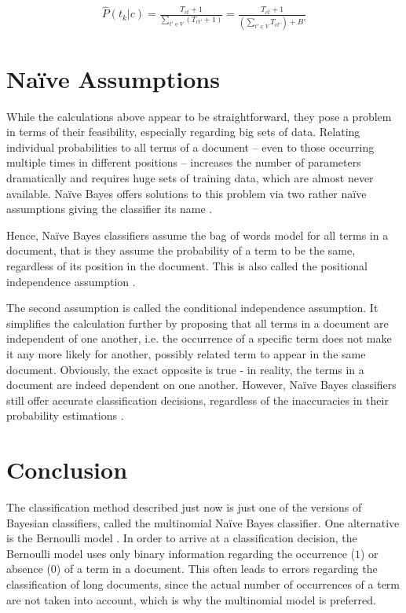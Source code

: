 \begin{gather}
    \hat{P}(t_{k}|c)    = \frac{T_{ct} + 1}{\sum_{t' \in V} (T_{ct'} + 1)}
                        = \frac{T_{ct} + 1}{(\sum_{t' \in V} T_{ct'}) + B'} \label{eq:laplace}
\end{gather}

\section{Na\"ive Assumptions} \label{sec:naive}

While the calculations above appear to be straightforward, they pose a problem in terms of their feasibility, especially regarding big sets of data. Relating individual probabilities to all terms of a document – even to those occurring multiple times in different positions – increases the number of parameters dramatically and requires huge sets of training data, which are almost never available. Naïve Bayes offers solutions to this problem via two rather na\"ive assumptions giving the classifier its name \citep{Manning2009, martin2018speech}. 

Hence, Na\"ive Bayes classifiers assume the bag of words model for all terms in a document, that is they assume the probability of a term to be the same, regardless of its position in the document. This is also called the positional independence assumption \citep{Manning2009, martin2018speech}.

The second assumption is called the conditional independence assumption. It simplifies the calculation further by proposing that all terms in a document are independent of one another, i.e. the occurrence of a specific term does not make it any more likely for another, possibly related term to appear in the same document. Obviously, the exact opposite is true - in reality, the terms in a document are indeed dependent on one another. However, Na\"ive Bayes classifiers still offer accurate classification decisions, regardless of the inaccuracies in their probability estimations \citep{Manning2009, martin2018speech}.  

\section{Conclusion}

The classification method described just now is just one of the versions of Bayesian classifiers, called the multinomial Na\"ive Bayes classifier. One alternative is the Bernoulli model \citep{Manning2009}. In order to arrive at a classification decision, the Bernoulli model uses only binary information regarding the occurrence ($1$) or absence ($0$) of a term in a document. This often leads to errors regarding the classification of long documents, since the actual number of occurrences of a term are not taken into account, which is why the multinomial model is preferred.
